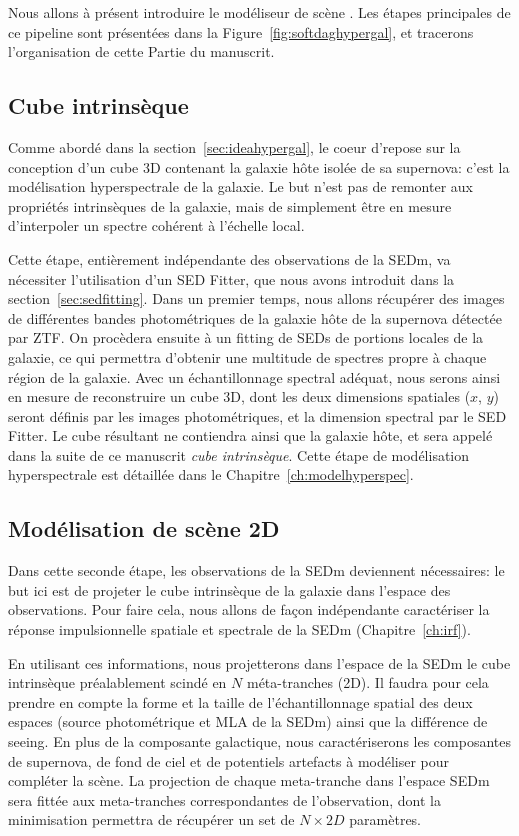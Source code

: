 \documentclass[../main/main.tex]{subfiles}
\begin{document}
Nous allons à présent introduire le modéliseur de scène \hypergal.
Les étapes principales de ce pipeline sont présentées dans la
Figure~\ref{fig:softdaghypergal}, et tracerons l'organisation de cette
Partie du manuscrit.

\subsection{Cube intrinsèque}

Comme abordé dans la section~\ref{sec:ideahypergal}, le coeur
d'\hypergal repose sur la conception d'un cube 3D contenant la galaxie
hôte isolée de sa supernova: c'est la modélisation hyperspectrale de la galaxie. Le but n'est pas de remonter aux propriétés
intrinsèques de la galaxie, mais de simplement être en mesure
d'interpoler un spectre cohérent à l'échelle local.

Cette étape, entièrement indépendante des observations de la
SEDm, va nécessiter l'utilisation d'un SED Fitter, que nous avons
introduit dans la section~\ref{sec:sedfitting}. Dans un premier temps,
nous allons 
récupérer des images de différentes bandes photométriques de la galaxie hôte de la supernova
détectée par ZTF. On procèdera ensuite à un fitting de SEDs de portions
locales de la galaxie, ce qui permettra d'obtenir une multitude de
spectres propre à chaque région de la galaxie. Avec un échantillonnage spectral
adéquat, nous serons ainsi en mesure de reconstruire un cube 3D, dont
les deux dimensions spatiales ($x$, $y$) seront définis par les images
photométriques, et la dimension spectral par le SED Fitter. Le cube
résultant ne contiendra ainsi que la galaxie hôte, et sera appelé dans
la suite de ce manuscrit \textit{cube intrinsèque}. Cette étape de
modélisation hyperspectrale est détaillée dans le Chapitre~\ref{ch:modelhyperspec}.

\subsection{Modélisation de scène 2D}

Dans cette seconde étape, les observations de la SEDm deviennent
nécessaires: le but ici est de projeter le cube intrinsèque de la
galaxie dans l'espace des observations. Pour faire cela, nous allons de
façon indépendante caractériser la réponse impulsionnelle spatiale et
spectrale de la SEDm (Chapitre~\ref{ch:irf}).

En utilisant ces informations, nous projetterons dans l'espace de la
SEDm le cube intrinsèque préalablement scindé en $N$ méta-tranches
(2D). Il faudra pour cela prendre en compte la forme et la taille de l'échantillonnage
spatial des deux espaces (source photométrique et MLA de la SEDm) ainsi que la différence de seeing.
En plus de la composante galactique, nous caractériserons les composantes
de supernova, de fond de ciel et de potentiels artefacts à modéliser
pour compléter la scène.
La projection de chaque meta-tranche dans l'espace SEDm sera fittée aux
meta-tranches correspondantes de l'observation, dont la minimisation permettra de récupérer un set de
$N\times2D$ paramètres.
\end{document}
